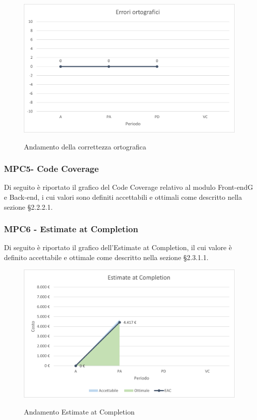 \begin{figure}[H]
\centering
\includegraphics[scale=0.78]{res/ResocontoAttivitaDiVerifica/res/metriche/grafici/img/correttezzaOrtografica.png}\\
\caption{Andamento della correttezza ortografica}
\end{figure}

\subsubsection{MPC5- Code Coverage}
Di seguito è riportato il grafico del Code Coverage relativo al modulo Front-end{G} e Back-end, i cui valori sono definiti accettabili e ottimali come descritto nella sezione §2.2.2.1.\\

\subsubsection{MPC6 - Estimate at Completion}
Di seguito è riportato il grafico dell'Estimate at Completion, il cui valore è definito accettabile e ottimale come descritto nella sezione §2.3.1.1.\\

\begin{figure}[H]
\centering
\includegraphics[scale=0.78]{res/ResocontoAttivitaDiVerifica/res/metriche/grafici/img/estimateCompletion.png}\\
\caption{Andamento Estimate at Completion}
\end{figure}

